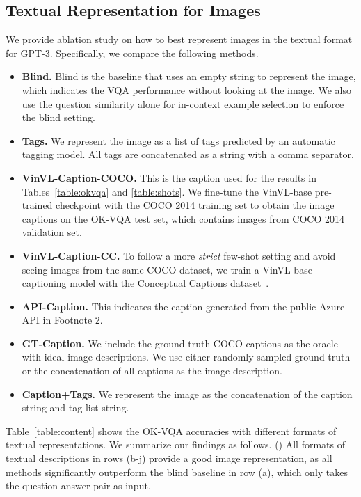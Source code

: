 \subsection{Textual Representation for Images}
We provide ablation study on how to best represent images in the textual format for GPT-3. Specifically, we compare the following methods.
\vspace{-2pt}
\begin{itemize} 
\setlength\itemsep{-2pt}
\item \textbf{Blind.} Blind is the baseline that uses an empty string to represent the image, which indicates the VQA performance without looking at the image. We also use the question similarity alone for in-context example selection to enforce the blind setting.
\item \textbf{Tags.} We represent the image as a list of tags predicted by an automatic tagging model. All tags are concatenated as a string with a comma separator.
\item \textbf{VinVL-Caption-COCO.} This is the caption used for the results in Tables~\ref{table:okvqa} and \ref{table:shots}. We fine-tune the VinVL-base pre-trained checkpoint with the COCO 2014 training set to obtain the image captions on the OK-VQA test set, which contains images from COCO 2014 validation set.
\item \textbf{VinVL-Caption-CC.} To follow a more \emph{strict} few-shot setting and avoid seeing images from the same COCO dataset, we train a VinVL-base captioning model with the Conceptual Captions dataset~\cite{sharma2018conceptual}.
\item \textbf{API-Caption.} This indicates the caption generated from the public Azure API in Footnote 2.
\item \textbf{GT-Caption.} We include the ground-truth COCO captions as the oracle with ideal image descriptions. We use either  randomly sampled ground truth or the concatenation of all  captions as the image description.
\item \textbf{Caption+Tags.} We represent the image as the concatenation of the caption string and tag list string.
\vspace{-2pt}
\end{itemize}
Table~\ref{table:content} shows the OK-VQA accuracies with different formats of textual representations. 
We summarize our findings as follows.
() All formats of textual descriptions in rows (b-j) provide a good image representation, as all methods significantly outperform the blind baseline in row (a), which only takes the question-answer pair as input.
